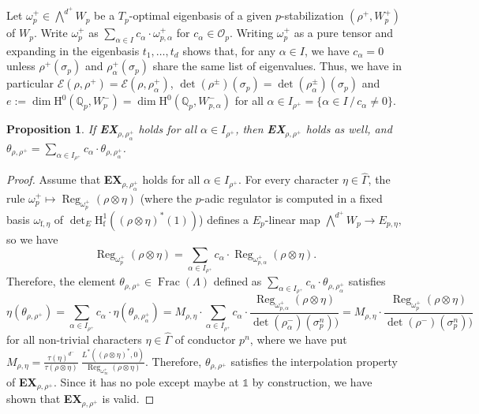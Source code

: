 \documentclass[12pt]{amsart}
\newcommand\Qp{{\mathbb{Q}_p}}
\newcommand\cE{\mathcal{E}}
\newcommand\cO{\mathcal{O}}
\DeclareMathOperator{\Frac}{Frac}
\DeclareMathOperator{\Reg}{Reg}
\newcommand{\HH}{\mathrm{H}}
\newcommand{\ff}{\mathrm{f}}
\theoremstyle{defstyle}
\theoremstyle{thmstyle}
\newtheorem{proposition}[subsubsection]{Proposition}
\begin{document}
Let $\omega_p^+\in {\bigwedge}^{d^+}W_p$ be a $T_p$-optimal eigenbasis of a given $p$-stabilization $(\rho^+,W_p^+)$ of $W_p$. Write $\omega_p^+$ as $\sum_{\alpha\in I} c_\alpha \cdot\omega_{p,\alpha}^+$ for $c_\alpha\in \cO_p$. Writing $\omega_{p}^+$ as a pure tensor and expanding in the eigenbasis $t_1,\ldots,t_d$ shows that, for any $\alpha\in I$, we have $c_\alpha=0$ unless $\rho^+(\sigma_p)$ and $\rho^+_\alpha(\sigma_p)$ share the same list of eigenvalues. Thus, we have in particular $\cE(\rho,\rho^+)=\cE(\rho,\rho^+_\alpha)$,  $\det(\rho^\pm)(\sigma_p)=\det(\rho_\alpha^\pm)(\sigma_p)$ and $e:=\dim \HH^0(\Qp,W_p^-)=\dim \HH^0(\Qp,W_{p,\alpha}^-)$ for all $\alpha\in I_{\rho^+}=\{\alpha\in I \, /\, c_\alpha\neq 0\}$.
\begin{proposition}\label{prop:changement_de_base}
	If \textbf{EX}$_{\rho,\rho^+_\alpha}$ holds for all $\alpha\in I_{\rho^+}$, then \textbf{EX}$_{\rho,\rho^+}$ holds as well, and $\theta_{\rho,\rho^+} = \sum_{\alpha \in I_{\rho^+}}c_\alpha\cdot \theta_{\rho,\rho^+_\alpha}$.
\end{proposition}
\begin{proof}
	Assume that \textbf{EX}$_{\rho,\rho^+_\alpha}$ holds for all $\alpha\in I_{\rho^+}$. For every character $\eta\in\widehat{\Gamma}$, the rule $\omega_p^+ \mapsto \Reg_{\omega_p^+}(\rho\otimes\eta)$ (where the $p$-adic regulator is computed in a fixed basis $\omega_{\ff,\eta}$ of $\det_E \HH^1_\ff((\rho\otimes\eta)^*(1))$) defines a $E_{p}$-linear map 
	${\bigwedge}^{d^+} W_p \longrightarrow E_{p,\eta},$ so we have $$\Reg_{\omega_p^+}(\rho\otimes\eta)=\sum_{\alpha \in I_{\rho^+}} c_\alpha\cdot \Reg_{\omega^+_{p,\alpha}}(\rho\otimes\eta).$$ Therefore, the element $\theta_{\rho,\rho^+}\in\Frac(\Lambda)$ defined as $\sum_{\alpha \in I_{\rho^+}}c_\alpha\cdot \theta_{\rho,\rho^+_\alpha}$ satisfies
	\[\eta(\theta_{\rho,\rho^+}) = \sum_{\alpha \in I_{\rho^+}}c_\alpha\cdot \eta(\theta_{\rho,\rho^+_\alpha}) =M_{\rho,\eta} \cdot \sum_{\alpha \in I_{\rho^+}}c_\alpha\cdot \frac{\Reg_{\omega^+_{p,\alpha}}(\rho\otimes\eta)}{\det(\rho_\alpha^-)(\sigma_p^n))} =M_{\rho,\eta} \cdot \frac{\Reg_{\omega^+_{p}}(\rho\otimes\eta)}{\det(\rho^-)(\sigma_p^n))}\]
	for all non-trivial characters $\eta\in\widehat{\Gamma}$ of conductor $p^n$, where we have put $M_{\rho,\eta}=\frac{\tau(\eta)^{d^-}}{\tau(\rho\otimes\eta)}\ \frac{L^{*}\left((\rho \otimes \eta)^*,0\right)}{\Reg_{\omega_\infty^+}(\rho\otimes\eta)}$. Therefore, $\theta_{\rho,\rho^+}$ satisfies the interpolation property of \textbf{EX}$_{\rho,\rho^+}$. Since it has no pole except maybe at $\mathds{1}$ by construction, we have shown that \textbf{EX}$_{\rho,\rho^+}$ is valid.
\end{proof}
\end{document}
